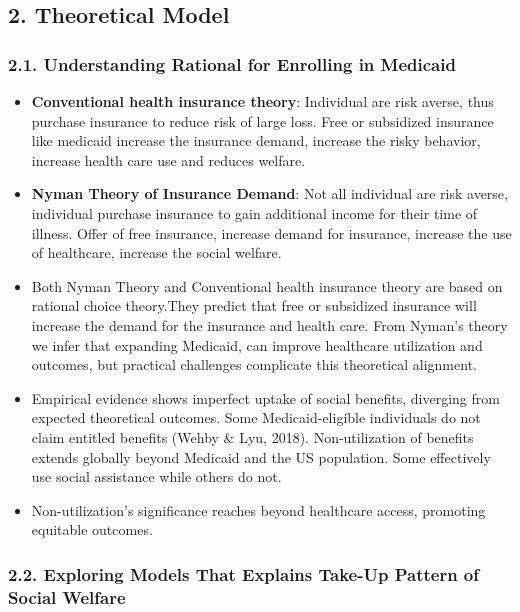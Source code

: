 \documentclass[
]{article}
\begin{document}
\hypertarget{theoretical-model}{%
\subsection{2. Theoretical Model}\label{theoretical-model}}

\hypertarget{understanding-rational-for-enrolling-in-medicaid}{%
\subsubsection{2.1. Understanding Rational for Enrolling in
Medicaid}\label{understanding-rational-for-enrolling-in-medicaid}}

\begin{itemize}
\item
  \textbf{Conventional health insurance theory}: Individual are risk
  averse, thus purchase insurance to reduce risk of large loss. Free or
  subsidized insurance like medicaid increase the insurance demand,
  increase the risky behavior, increase health care use and reduces
  welfare.
\item
  \textbf{Nyman Theory of Insurance Demand}: Not all individual are risk
  averse, individual purchase insurance to gain additional income for
  their time of illness. Offer of free insurance, increase demand for
  insurance, increase the use of healthcare, increase the social
  welfare.
\item
  Both Nyman Theory and Conventional health insurance theory are based
  on rational choice theory.They predict that free or subsidized
  insurance will increase the demand for the insurance and health care.
  From Nyman's theory we infer that expanding Medicaid, can improve
  healthcare utilization and outcomes, but practical challenges
  complicate this theoretical alignment.
\item
  Empirical evidence shows imperfect uptake of social benefits,
  diverging from expected theoretical outcomes. Some Medicaid-eligible
  individuals do not claim entitled benefits (Wehby \& Lyu, 2018).
  Non-utilization of benefits extends globally beyond Medicaid and the
  US population. Some effectively use social assistance while others do
  not.
\item
  Non-utilization's significance reaches beyond healthcare access,
  promoting equitable outcomes.
\end{itemize}

\hypertarget{exploring-models-that-explains-take-up-pattern-of-social-welfare}{%
\subsubsection{2.2. Exploring Models That Explains Take-Up Pattern of
Social
Welfare}\label{exploring-models-that-explains-take-up-pattern-of-social-welfare}}
\end{document}
